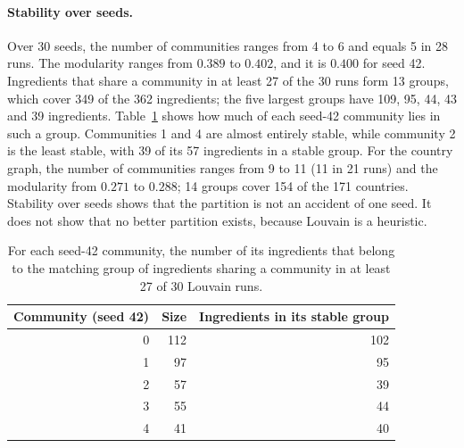 \paragraph{Stability over seeds.}
Over 30 seeds, the number of communities ranges from 4 to 6 and equals 5 in 28
runs. The modularity ranges from $0.389$ to $0.402$, and it is $0.400$ for
seed 42. Ingredients that share a community in at least 27 of the 30 runs form
13 groups, which cover 349 of the 362 ingredients; the five largest groups
have 109, 95, 44, 43 and 39 ingredients. Table~\ref{tab:stability} shows how
much of each seed-42 community lies in such a group. Communities 1 and 4 are
almost entirely stable, while community 2 is the least stable, with 39 of its
57 ingredients in a stable group. For the country graph, the number of
communities ranges from 9 to 11 (11 in 21 runs) and the modularity from $0.271$
to $0.288$; 14 groups cover 154 of the 171 countries. Stability over seeds shows
that the partition is not an accident of one seed. It does not show that no
better partition exists, because Louvain is a heuristic.

\begin{table}[h]
\centering
\small
\begin{tabular}{@{}r r r@{}}
\toprule
Community (seed 42) & Size & Ingredients in its stable group \\
\midrule
0 & 112 & 102 \\
1 & 97 & 95 \\
2 & 57 & 39 \\
3 & 55 & 44 \\
4 & 41 & 40 \\
\bottomrule
\end{tabular}
\caption{For each seed-42 community, the number of its ingredients that belong
to the matching group of ingredients sharing a community in at least 27 of 30
Louvain runs.}
\label{tab:stability}
\end{table}

